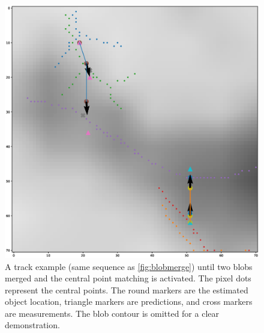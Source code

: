\begin{figure}
  \centering
  \includegraphics[width=\textwidth]{figures/trackexample2.eps}
  \caption{A track example (same sequence as \autoref{fig:blobmerge}) until two blobs merged and the central point matching is activated. The pixel dots represent the central points. The round markers are the estimated object location, triangle markers are predictions, and cross markers are measurements. The blob contour is omitted for a clear demonstration.}\label{fig:trackexample2}
\end{figure}
